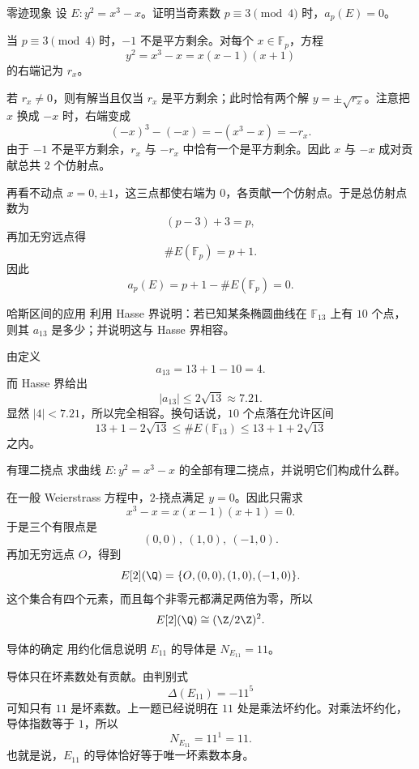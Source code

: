 \begin{problem}{零迹现象}
\medium
设 $E:y^2=x^3-x$。证明当奇素数 $p\equiv 3\pmod 4$ 时，$a_p(E)=0$。
\end{problem}
\begin{solution}
当 $p\equiv 3\pmod 4$ 时，$-1$ 不是平方剩余。对每个 $x\in\mathbb{F}_p$，方程
\[
y^2=x^3-x=x(x-1)(x+1)
\]
的右端记为 $r_x$。

若 $r_x\ne 0$，则有解当且仅当 $r_x$ 是平方剩余；此时恰有两个解 $y=\pm\sqrt{r_x}$。注意把 $x$ 换成 $-x$ 时，右端变成
\[
(-x)^3-(-x)=-(x^3-x)=-r_x.
\]
由于 $-1$ 不是平方剩余，$r_x$ 与 $-r_x$ 中恰有一个是平方剩余。因此 $x$ 与 $-x$ 成对贡献总共 $2$ 个仿射点。

再看不动点 $x=0,\pm1$，这三点都使右端为 $0$，各贡献一个仿射点。于是总仿射点数为
\[
(p-3)+3=p,
\]
再加无穷远点得
\[
\#E(\mathbb{F}_p)=p+1.
\]
因此
\[
a_p(E)=p+1-\#E(\mathbb{F}_p)=0.
\]
\end{solution}

\begin{problem}{哈斯区间的应用}
\medium
利用 Hasse 界说明：若已知某条椭圆曲线在 $\mathbb{F}_{13}$ 上有 $10$ 个点，则其 $a_{13}$ 是多少；并说明这与 Hasse 界相容。
\end{problem}
\begin{solution}
由定义
\[
a_{13}=13+1-10=4.
\]
而 Hasse 界给出
\[
|a_{13}|\le 2\sqrt{13}\approx 7.21.
\]
显然 $|4|<7.21$，所以完全相容。换句话说，$10$ 个点落在允许区间
\[
13+1-2\sqrt{13}\le \#E(\mathbb{F}_{13})\le 13+1+2\sqrt{13}
\]
之内。
\end{solution}

\begin{problem}{有理二挠点}
\medium
求曲线 $E:y^2=x^3-x$ 的全部有理二挠点，并说明它们构成什么群。
\end{problem}
\begin{solution}
在一般 Weierstrass 方程中，$2$-挠点满足 $y=0$。因此只需求
\[
x^3-x=x(x-1)(x+1)=0.
\]
于是三个有限点是
\[
(0,0),\ (1,0),\ (-1,0).
\]
再加无穷远点 $O$，得到
\[
E[2](\Q)=\{O,(0,0),(1,0),(-1,0)\}.
\]
这个集合有四个元素，而且每个非零元都满足两倍为零，所以
\[
E[2](\Q)\cong (\Z/2\Z)^2.
\]
\end{solution}

\begin{problem}{导体的确定}
\medium
用约化信息说明 $E_{11}$ 的导体是 $N_{E_{11}}=11$。
\end{problem}
\begin{solution}
导体只在坏素数处有贡献。由判别式
\[
\Delta(E_{11})=-11^5
\]
可知只有 $11$ 是坏素数。上一题已经说明在 $11$ 处是乘法坏约化。对乘法坏约化，导体指数等于 $1$，所以
\[
N_{E_{11}}=11^1=11.
\]
也就是说，$E_{11}$ 的导体恰好等于唯一坏素数本身。
\end{solution}

